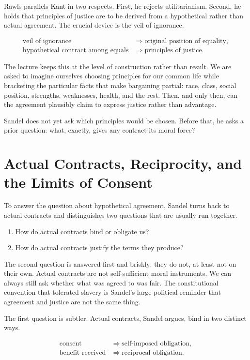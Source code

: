 Rawls parallels Kant in two respects. First, he rejects utilitarianism. Second, he holds that principles of justice are to be derived from a hypothetical rather than actual agreement. The crucial device is the veil of ignorance.

\begin{align}
\text{veil of ignorance} &\Longrightarrow \text{original position of equality}, \\
\text{hypothetical contract among equals} &\Longrightarrow \text{principles of justice}.
\end{align}

The lecture keeps this at the level of construction rather than result. We are asked to imagine ourselves choosing principles for our common life while bracketing the particular facts that make bargaining partial: race, class, social position, strengths, weaknesses, health, and the rest. Then, and only then, can the agreement plausibly claim to express justice rather than advantage.

Sandel does not yet ask which principles would be chosen. Before that, he asks a prior question: what, exactly, gives any contract its moral force?

\section{Actual Contracts, Reciprocity, and the Limits of Consent}

To answer the question about hypothetical agreement, Sandel turns back to actual contracts and distinguishes two questions that are usually run together.

\begin{enumerate}
\item How do actual contracts bind or obligate us?
\item How do actual contracts justify the terms they produce?
\end{enumerate}

The second question is answered first and briskly: they do not, at least not on their own. Actual contracts are not self-sufficient moral instruments. We can always still ask whether what was agreed to was fair. The constitutional convention that tolerated slavery is Sandel's large political reminder that agreement and justice are not the same thing.

The first question is subtler. Actual contracts, Sandel argues, bind in two distinct ways.

\begin{align}
\text{consent} &\Longrightarrow \text{self-imposed obligation}, \\
\text{benefit received} &\Longrightarrow \text{reciprocal obligation}.
\end{align}


